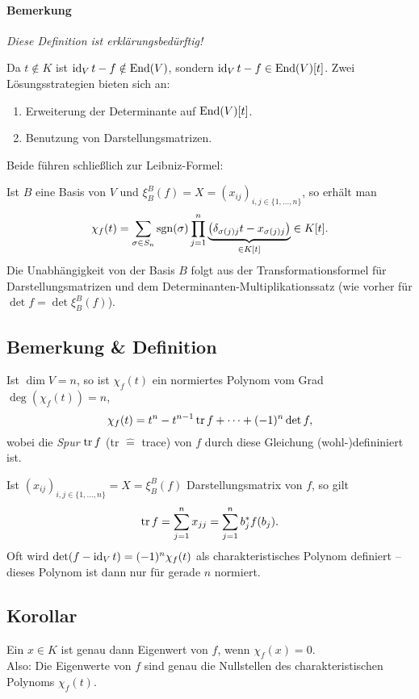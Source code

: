 \paragraph{Bemerkung}
	\emph{Diese Definition ist erklärungsbedürftig!}
	
	Da $ t\notin K $ ist $ \operatorname{id}_Vt-f\notin \operatorname{End}(V) $, sondern $ \operatorname{id}_Vt-f\in\operatorname{End}(V)[t] $. Zwei Lösungsstrategien bieten sich an:
		\begin{enumerate}
			\item Erweiterung der Determinante auf $ \operatorname{End}(V)[t] $.
			\item Benutzung von Darstellungsmatrizen.
		\end{enumerate}
	Beide führen schließlich zur Leibniz-Formel:
	
	Ist $ B $ eine Basis von $ V $ und $ \xi_B^B(f) = X = (x_{ij})_{i,j\in\{1,\dots,n\}}$, so erhält man 
		\[ \chi_f(t)=\sum_{\sigma\in S_n}\operatorname{sgn}(\sigma)\prod_{j=1}^{n}\underset{\in K[t]}{\underbrace{\left(\delta_{\sigma(j)j}t-x_{\sigma(j)j}\right)}} \in K[t]. \]
	Die Unabhängigkeit von der Basis $ B $ folgt aus der Transformationsformel für Darstellungsmatrizen und dem Determinanten-Multiplikationssatz (wie vorher für $ \det f = \det \xi_B^B(f) $).


\subsection{Bemerkung \& Definition}
\begin{Definition}[Spur]
	Ist $ \dim V=n $, so ist $ \chi_f(t) $ ein normiertes Polynom vom Grad $ \deg\left(\chi_f(t)\right)=n $,
		\[ \chi_f(t)=t^n-t^{n-1}\operatorname{tr} f + \dots + (-1)^n\det f,\] %
	wobei die \emph{Spur} $ \operatorname{tr} f $ (\glqq tr \grqq $\widehat{=}$ trace) von $ f $ durch diese Gleichung (wohl-)defininiert ist.
\end{Definition}	
	Ist $ (x_{ij})_{i,j\in\{1,\dots,n\}} = X = \xi_B^B(f) $ Darstellungsmatrix von $ f $, so gilt
		\[ \operatorname{tr} f = \sum_{j=1}^{n}x_{jj} = \sum_{j=1}^{n} b_j^*f(b_j). \]
	Oft wird $ \det(f-\operatorname{id}_Vt)=(-1)^n\chi_f(t) $ als charakteristisches Polynom definiert -- dieses Polynom ist dann nur für gerade $ n $ normiert.
\subsection{Korollar}
\begin{Korollar}
	Ein $ x\in K $ ist genau dann Eigenwert von $ f $, wenn $ \chi_f(x)=0 $.\\
	Also: Die Eigenwerte von $ f $ sind genau die Nullstellen des charakteristischen Polynoms $ \chi_f(t) $.
\end{Korollar}
